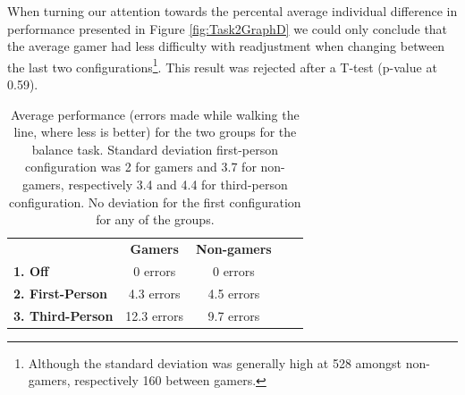 \documentclass[runningheads,a4paper,oribibl]{llncs}
\begin{document}
When turning our attention towards the percental average individual difference in performance presented in Figure \ref{fig:Task2GraphD} we could only conclude that the average gamer had less difficulty with readjustment when changing between the last two configurations\footnote{Although the standard deviation was generally high at 528 amongst non-gamers, respectively 160 between gamers.}. This result was rejected after a T-test (p-value at 0.59).


\begin{table}[]
\centering
\setlength{\tabcolsep}{1em}
\def\arraystretch{1.8}
\begin{tabular}{l|c|cll}
                      & {\textbf{Gamers}} & {\textbf{Non-gamers}} &  &  \\ \cline{1-3}
\textbf{1. Off}          & 0 errors                                    & 0 errors                                          &  &  \\ \cline{1-3}
\textbf{2. First-Person} & 4.3 errors                                   & 4.5 errors                                        &  &  \\ \cline{1-3}
\textbf{3. Third-Person} & 12.3 errors                                    & 9.7 errors                                        &  & 
\end{tabular}
\caption{Average performance (errors made while walking the line, where less is better) for the two groups for the balance task. Standard deviation first-person configuration was 2 for gamers and 3.7 for non-gamers, respectively 3.4 and 4.4 for third-person configuration. No deviation for the first configuration for any of the groups.}
\label{tab:Task2GraphP}
\end{table}




\end{document}
